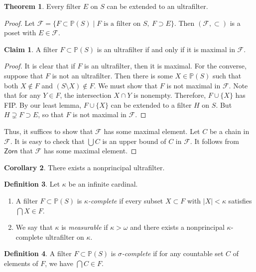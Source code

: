 \documentclass[10pt,letterpaper,cm]{nupset}
\theoremstyle{definition}
\newtheorem{definition}{Definition}[subsection]
\theoremstyle{theorem}
\newtheorem{theorem}[definition]{Theorem}
\newtheorem{corollary}[definition]{Corollary}
\newtheorem*{claim}{Claim}
\theoremstyle{remark}
\renewcommand{\P}{\mathbb P}
\newcommand{\1}{\mathbf{1}}
\newcommand{\0}{\vec 0}
\begin{document}
\begin{theorem}
Every filter $E$ on $S$ can be extended to an ultrafilter.
\end{theorem}
\begin{proof}
Let $\mathcal{F} = \{F \subset \P(S) \mid F \text{ is a filter on }S,\  F\supset E\}$. Then $(\mathcal{F}, \subset)$ is a poset with $E\in \mathcal{F}$. 
\begin{claim}
 A filter $F\subset \P(S)$ is an ultrafilter if and only if it is maximal in $\mathcal{F}$.
\end{claim}
\begin{proof}
It is clear that if $F$ is an ultrafilter, then it is maximal. For the converse, suppose that $F$ is not an ultrafilter. Then there is some $X\in \P(S)$ such that both $X \notin F$ and $(S\setminus X) \notin F$. We must show that $F$ is not maximal in $\mathcal{F}$. 
Note that for any $Y \in F$, the intersection $X \cap Y$ is nonempty. Therefore, $F \cup \{X\}$ has FIP. By our least lemma, $F \cup \{X\}$ can be extended to a filter $H$ on $S$. But $H \supsetneq F \supset E$, so that $F$ is not maximal in $\mathcal{F}$.
\end{proof}
Thus, it suffices to show that $\mathcal{F}$ has some maximal element. Let $C$ be a chain in $\mathcal{F}$. It is easy to check that $\bigcup{C}$ is an upper bound of $C$ in $\mathcal{F}$. It follows from $\mathsf{Zorn}$ that $\mathcal{F}$ has some maximal element. 
\end{proof}

\begin{corollary}
There exists a nonprincipal ultrafilter. 
\end{corollary}

\begin{definition} Let $\kappa$ be an infinite cardinal.
\begin{enumerate}
\item A filter $F\subset \P(S)$ is \textit{$\kappa$-complete} if every subset $X\subset F$ with $\lvert{X}\rvert < \kappa$ satisfies $\bigcap{X} \in F$.
\item We say that $\kappa$ is \textit{measurable} if $\kappa > \omega$ and there exists a nonprincipal $\kappa$-complete ultrafilter on $\kappa$. 
\end{enumerate}
\end{definition}

\begin{definition}
A filter $F\subset \P(S)$ is \textit{$\sigma$-complete} if for any countable set $C$ of elements of $F$, we have $\bigcap{C} \in F$.
\end{definition}
\end{document}
